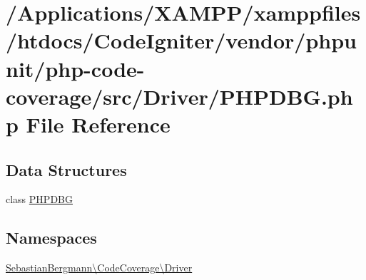 \hypertarget{_p_h_p_d_b_g_8php}{}\section{/\+Applications/\+X\+A\+M\+P\+P/xamppfiles/htdocs/\+Code\+Igniter/vendor/phpunit/php-\/code-\/coverage/src/\+Driver/\+P\+H\+P\+D\+BG.php File Reference}
\label{_p_h_p_d_b_g_8php}
\subsection*{Data Structures}
\begin{DoxyCompactItemize}
\item 
class \mbox{\hyperlink{class_sebastian_bergmann_1_1_code_coverage_1_1_driver_1_1_p_h_p_d_b_g}{P\+H\+P\+D\+BG}}
\end{DoxyCompactItemize}
\subsection*{Namespaces}
\begin{DoxyCompactItemize}
\item 
 \mbox{\hyperlink{namespace_sebastian_bergmann_1_1_code_coverage_1_1_driver}{Sebastian\+Bergmann\textbackslash{}\+Code\+Coverage\textbackslash{}\+Driver}}
\end{DoxyCompactItemize}
